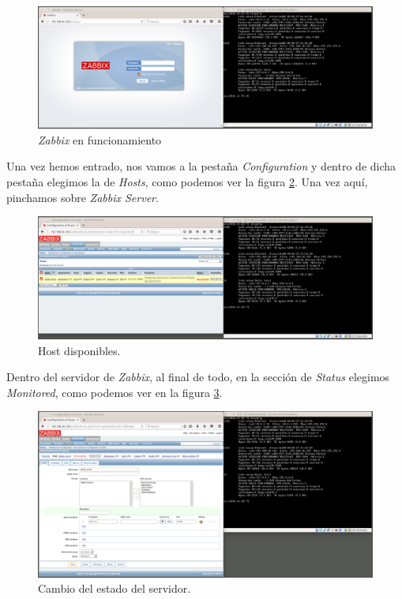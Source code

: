 \documentclass[a4paper,titlepage,12pt]{scrartcl}	%
\numberwithin{figure}{section} %
\numberwithin{table}{section} %
\begin{document}
	\begin{figure}[H]
		\includegraphics[width=\linewidth]{./Imagenes/O4-14.png}
		\vspace{-0.5cm}
		\caption[\textit{Zabbix} en funcionamiento.]{\textit{Zabbix} en funcionamiento}
		\label{O4-14}
	\end{figure}
	
	Una vez hemos entrado, nos vamos a la pestaña \textit{Configuration} y dentro de dicha pestaña elegimos la de \textit{Hosts}, como podemos ver la figura \ref{O4-15}. Una vez aquí, pinchamos sobre \textit{Zabbix Server}.
	
	\begin{figure}[H]
		\includegraphics[width=\linewidth]{./Imagenes/O4-15.png}
		\vspace{-0.5cm}
		\caption[Host disponibles.]{Host disponibles.}
		\label{O4-15}
	\end{figure}
	
	Dentro del servidor de \textit{Zabbix}, al final de todo, en la sección de \textit{Status} elegimos \textit{Monitored}, como podemos ver en la figura \ref{O4-16}.
	
	\begin{figure}[H]
		\includegraphics[width=\linewidth]{./Imagenes/O4-16.png}
		\vspace{-0.5cm}
		\caption[Cambio del estado del servidor.]{Cambio del estado del servidor.}
		\label{O4-16}
	\end{figure}
	
\end{document}
